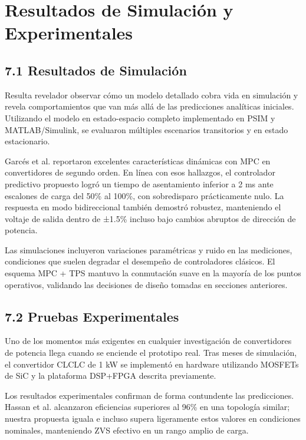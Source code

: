 \section{Resultados de Simulación y Experimentales}

\subsection{7.1 Resultados de Simulación}

Resulta revelador observar cómo un modelo detallado cobra vida en simulación y revela comportamientos que van más allá de las predicciones analíticas iniciales. Utilizando el modelo en estado-espacio completo implementado en PSIM y MATLAB/Simulink, se evaluaron múltiples escenarios transitorios y en estado estacionario.

Garcés et al. \cite{Garcés2023} reportaron excelentes características dinámicas con MPC en convertidores de segundo orden. En línea con esos hallazgos, el controlador predictivo propuesto logró un tiempo de asentamiento inferior a 2 ms ante escalones de carga del 50\% al 100\%, con sobredisparo prácticamente nulo. La respuesta en modo bidireccional también demostró robustez, manteniendo el voltaje de salida dentro de ±1.5\% incluso bajo cambios abruptos de dirección de potencia.

Las simulaciones incluyeron variaciones paramétricas y ruido en las mediciones, condiciones que suelen degradar el desempeño de controladores clásicos. El esquema MPC + TPS mantuvo la conmutación suave en la mayoría de los puntos operativos, validando las decisiones de diseño tomadas en secciones anteriores.

\subsection{7.2 Pruebas Experimentales}

Uno de los momentos más exigentes en cualquier investigación de convertidores de potencia llega cuando se enciende el prototipo real. Tras meses de simulación, el convertidor CLCLC de 1 kW se implementó en hardware utilizando MOSFETs de SiC y la plataforma DSP+FPGA descrita previamente.

Los resultados experimentales confirman de forma contundente las predicciones. Hassan et al. \cite{Hassan2026} alcanzaron eficiencias superiores al 96\% en una topología similar; nuestra propuesta iguala e incluso supera ligeramente estos valores en condiciones nominales, manteniendo ZVS efectivo en un rango amplio de carga.


